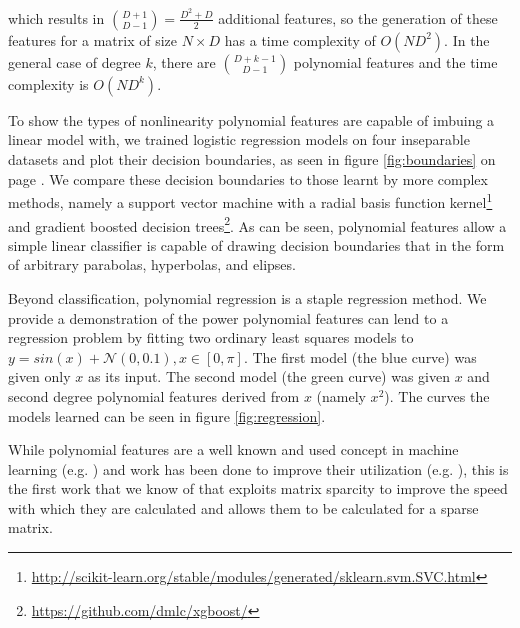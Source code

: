 \documentclass[11pt,twocolumn]{article}
\begin{document}
which results in $\binom{D+1}{D-1} = \frac{D^2+D}{2}$ additional features, so the generation of 
these features for a matrix of size $N \times D$ has a time complexity of $O(ND^2)$. In the general case of degree $k$, there 
are $\binom{D+k-1}{D-1}$ polynomial features and the time complexity is $O(ND^k)$.

To show the types of nonlinearity polynomial features are capable of imbuing a linear model with,
we trained logistic regression models on four inseparable datasets and plot their decision boundaries, as seen in figure \eqref{fig:boundaries} on page \pageref{fig:boundaries}. We compare
these decision boundaries to those learnt by more complex methods, namely a support vector machine with a radial basis function kernel\footnote{\url{http://scikit-learn.org/stable/modules/generated/sklearn.svm.SVC.html}} 
and gradient boosted decision trees\footnote{\url{https://github.com/dmlc/xgboost/}}. As can be seen, polynomial features allow a simple linear classifier is capable of drawing decision boundaries
that in the form of arbitrary parabolas, hyperbolas, and elipses.

Beyond classification, polynomial regression \cite{theoryoflinearmodels} is a staple regression method.
We provide a demonstration of the power polynomial features can lend to a regression problem by fitting two ordinary least squares models to $y=sin(x) + \mathcal{N}(0, 0.1), x \in [0, \pi]$. The first model (the blue curve) was given only $x$ as its input. The second model (the green curve) was given $x$ and second degree polynomial features derived from $x$ (namely $x^2$). The curves the models learned can be seen in figure \ref{fig:regression}.

While polynomial features are a well known and used concept in machine learning (e.g. \cite{pavlidis2002learning, konidaris2009skill, wiesler2009investigations}) and work has been done to improve their utilization (e.g. \cite{pevckov2008minimal, huang2010predicting}), this is the first work that we know of that exploits matrix sparcity 
to improve the speed with which they are calculated and allows them to be calculated for a sparse matrix.
\end{document}
